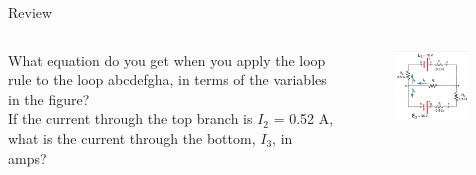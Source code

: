 \documentclass{beamer}
\begin{document}
\begin{frame}{Review}
\begin{columns}[T]
\begin{column}{0.5\textwidth}
\small
What equation do you get when you apply the loop rule to the loop abcdefgha, in terms of the variables in the figure? \\ \vspace{0.5cm}
If the current through the top branch is $I_2$ = 0.52 A, what is the current through the bottom, $I_3$, in amps? 
\end{column}
\begin{column}{0.5\textwidth}
\begin{figure}
\centering
\includegraphics[width=0.95\textwidth]{ex4.png}
\caption{\label{fig:ex4}}
\end{figure}
\end{column}
\end{columns}
\end{frame}
\end{document}

